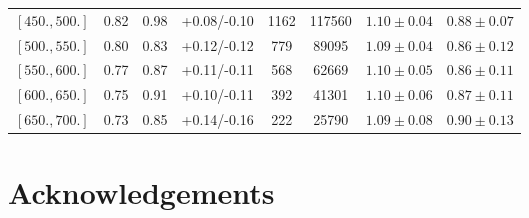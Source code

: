 \documentclass[%
 floatfix,
 reprint,
 twocolumn,
superscriptaddress,
showpacs,preprintnumbers,
 amsmath,amssymb,
 aps,
prd,
]{revtex4-1}
\begin{document}
\begin{table*}[p]
\begin{ruledtabular}
\begin{tabular}{cccccccc}
$[ 450. , 500. ]$& 0.82  & 0.98 &+0.08/-0.10 & 1162 & 117560 & $1.10 \pm 0.04$ & $0.88 \pm 0.07$ \\
$[ 500. , 550. ]$& 0.80  & 0.83 &+0.12/-0.12 & 779  & 89095  & $1.09 \pm 0.04$ & $0.86 \pm 0.12$ \\
$[ 550. , 600. ]$& 0.77  & 0.87 &+0.11/-0.11 & 568  & 62669  & $1.10 \pm 0.05$ & $0.86 \pm 0.11$ \\
$[ 600. , 650. ]$& 0.75  & 0.91 &+0.10/-0.11 & 392  & 41301  & $1.10 \pm 0.06$ & $0.87 \pm 0.11$ \\
$[ 650. , 700. ]$& 0.73  & 0.85 &+0.14/-0.16 & 222  & 25790  & $1.09 \pm 0.08$ & $0.90 \pm 0.13$ \\
\end{tabular}
\end{ruledtabular}
\end{table*}

\section{\label{sec:Results}Acknowledgements}
   

\end{document}
